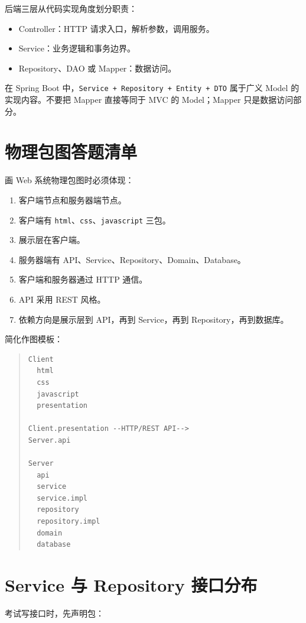 \documentclass[UTF8,zihao=-4]{ctexart}
\begin{document}
后端三层从代码实现角度划分职责：

\begin{itemize}
\item Controller：HTTP 请求入口，解析参数，调用服务。
\item Service：业务逻辑和事务边界。
\item Repository、DAO 或 Mapper：数据访问。
\end{itemize}

在 Spring Boot 中，\texttt{Service + Repository + Entity + DTO} 属于广义 Model 的实现内容。不要把 Mapper 直接等同于 MVC 的 Model；Mapper 只是数据访问部分。

\section{物理包图答题清单}

画 Web 系统物理包图时必须体现：

\begin{enumerate}
\item 客户端节点和服务器端节点。
\item 客户端有 \texttt{html}、\texttt{css}、\texttt{javascript} 三包。
\item 展示层在客户端。
\item 服务器端有 API、Service、Repository、Domain、Database。
\item 客户端和服务器通过 HTTP 通信。
\item API 采用 REST 风格。
\item 依赖方向是展示层到 API，再到 Service，再到 Repository，再到数据库。
\end{enumerate}

简化作图模板：

\begin{quote}
\footnotesize
\begin{verbatim}
Client
  html
  css
  javascript
  presentation

Client.presentation --HTTP/REST API--> 
Server.api

Server
  api
  service
  service.impl
  repository
  repository.impl
  domain
  database
\end{verbatim}
\end{quote}

\section{Service 与 Repository 接口分布}

考试写接口时，先声明包：
\end{document}
